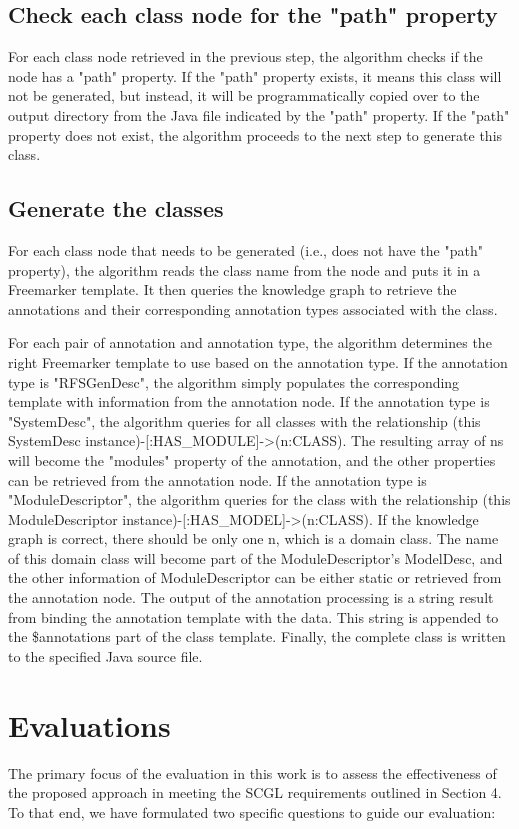 \documentclass[runningheads]{llncs}
\begin{document}
\subsection{Check each class node for the "path" property}
For each class node retrieved in the previous step, the algorithm checks if the node has a "path" property. If the "path" property exists, it means this class will not be generated, but instead, it will be programmatically copied over to the output directory from the Java file indicated by the "path" property.  If the "path" property does not exist, the algorithm proceeds to the next step to generate this class.

\subsection{Generate the classes}
For each class node that needs to be generated (i.e., does not have the "path" property), the algorithm reads the class name from the node and puts it in a Freemarker template. It then queries the knowledge graph to retrieve the annotations and their corresponding annotation types associated with the class.

For each pair of annotation and annotation type, the algorithm determines the right Freemarker template to use based on the annotation type. If the annotation type is "RFSGenDesc", the algorithm simply populates the corresponding template with information from the annotation node. If the annotation type is "SystemDesc", the algorithm queries for all classes with the relationship (this SystemDesc instance)-[:HAS\_MODULE]->(n:CLASS). The resulting array of ns will become the "modules" property of the annotation, and the other properties can be retrieved from the annotation node. If the annotation type is "ModuleDescriptor", the algorithm queries for the class with the relationship (this ModuleDescriptor instance)-[:HAS\_MODEL]->(n:CLASS). If the knowledge graph is correct, there should be only one n, which is a domain class. The name of this domain class will become part of the ModuleDescriptor's ModelDesc, and the other information of ModuleDescriptor can be either static or retrieved from the annotation node. The output of the annotation processing is a string result from binding the annotation template with the data. This string is appended to the \${annotations} part of the class template. Finally, the complete class is written to the specified Java source file.

\section{Evaluations} \label{section5}
The primary focus of the evaluation in this work is to assess the effectiveness of the proposed approach in meeting the SCGL requirements outlined in Section 4. To that end, we have formulated two specific questions to guide our evaluation:
\end{document}
